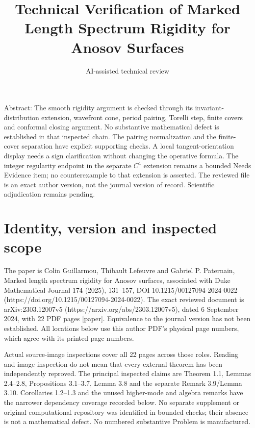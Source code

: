 \documentclass[10pt]{article}
\title{Technical Verification of
Marked Length Spectrum Rigidity for Anosov Surfaces}
\author{AI-assisted technical review}
\date{}
\begin{document}
\maketitle
Abstract: The smooth rigidity argument is checked through its invariant-distribution extension, wavefront cone, period pairing, Torelli step, finite covers and conformal closing argument. No substantive mathematical defect is established in that inspected chain. The pairing normalization and the finite-cover separation have explicit supporting checks. A local tangent-orientation display needs a sign clarification without changing the operative formula. The integer regularity endpoint in the separate \(C^4\) extension remains a bounded Needs Evidence item; no counterexample to that extension is asserted. The reviewed file is an exact author version, not the journal version of record. Scientific adjudication remains pending.\par
\section*{Identity, version and inspected scope}
The paper is Colin Guillarmou, Thibault Lefeuvre and Gabriel P. Paternain, Marked length spectrum rigidity for Anosov surfaces, associated with Duke Mathematical Journal 174 (2025), 131–157, DOI 10.1215/00127094-2024-0022 (https://doi.org/10.1215/00127094-2024-0022). The exact reviewed document is arXiv:2303.12007v5 (https://arxiv.org/abs/2303.12007v5), dated 6 September 2024, with 22 PDF pages [paper]. Equivalence to the journal version has not been established. All locations below use this author PDF’s physical page numbers, which agree with its printed page numbers.\par
Actual source-image inspections cover all 22 pages across those roles. Reading and image inspection do not mean that every external theorem has been independently reproved. The principal inspected claims are Theorem 1.1, Lemmas 2.4–2.8, Propositions 3.1–3.7, Lemma 3.8 and the separate Remark 3.9/Lemma 3.10. Corollaries 1.2–1.3 and the unused higher-mode and algebra remarks have the narrower dependency coverage recorded below. No separate supplement or original computational repository was identified in bounded checks; their absence is not a mathematical defect. No numbered substantive Problem is manufactured.\par
\end{document}
